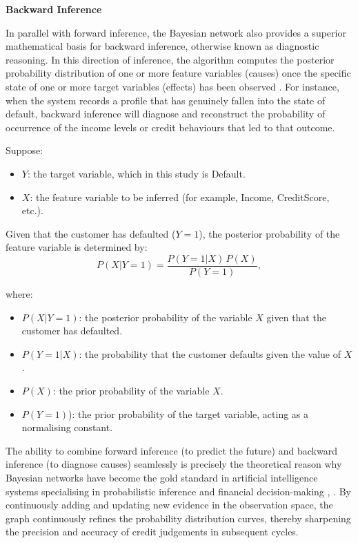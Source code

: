 \vspace{1em}
\noindent
\textbf{Backward Inference}

\noindent
In parallel with forward inference, the Bayesian network also provides a superior mathematical basis for backward inference, otherwise known as diagnostic reasoning. In this direction of inference, the algorithm computes the posterior probability distribution of one or more feature variables (causes) once the specific state of one or more target variables (effects) has been observed \cite{pearl2009causality}. For instance, when the system records a profile that has genuinely fallen into the state of default, backward inference will diagnose and reconstruct the probability of occurrence of the income levels or credit behaviours that led to that outcome. 

\vspace{1em}
\noindent
Suppose:
\begin{itemize}
    \item $Y$: the target variable, which in this study is Default.
    \item $X$: the feature variable to be inferred (for example, Income, CreditScore, etc.).
\end{itemize}

\vspace{1em}
Given that the customer has defaulted ($Y=1$), the posterior probability of the feature variable is determined by:
\begin{equation}
    P(X|Y=1) = \frac{P(Y=1|X)\,P(X)} {P(Y=1)},
\end{equation}

\noindent
where:
\begin{itemize}
    \item $P(X|Y=1)$: the posterior probability of the variable $X$ given that the customer has defaulted.
    \item $P(Y=1|X)$: the probability that the customer defaults given the value of $X$.
    \item $P(X)$: the prior probability of the variable $X$.
    \item $P(Y=1)$): the prior probability of the target variable, acting as a normalising constant.
\end{itemize}

\vspace{1em}
The ability to combine forward inference (to predict the future) and backward inference (to diagnose causes) seamlessly is precisely the theoretical reason why Bayesian networks have become the gold standard in artificial intelligence systems specialising in probabilistic inference and financial decision-making \cite{darwiche2009modeling}, \cite{liu2024credit}. By continuously adding and updating new evidence in the observation space, the graph continuously refines the probability distribution curves, thereby sharpening the precision and accuracy of credit judgements in subsequent cycles.


